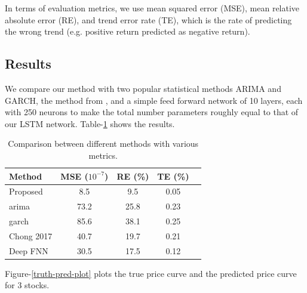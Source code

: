 \documentclass{article}
\begin{document}
In terms of evaluation metrics, we use mean squared error (MSE), mean relative absolute error (RE), and trend error rate (TE), which is the rate of predicting the wrong trend (e.g. positive return predicted as negative return).

\subsection{Results}
We compare our method with two popular statistical methods ARIMA and GARCH, the method from \cite{Chong2017}, and a simple feed forward network of 10 layers, each with 250 neurons to make the total number parameters roughly equal to that of our LSTM network. Table-\ref{comparison-table} shows the results.

\begin{table}[t]
\caption{Comparison between different methods with various metrics.}
\label{comparison-table}
\vskip 0.15in
\begin{center}
\begin{small}
\begin{sc}
\begin{tabular}{lcccr}
\hline
\abovespace\belowspace
Method & MSE ($10^{-7}$) & RE (\%) & TE (\%) \\
\hline
\abovespace
Proposed   & 8.5& 9.5& 0.05  \\
arima      & 73.2& 25.8& 0.23 \\
garch      & 85.6& 38.1& 0.25  \\
Chong 2017 & 40.7& 19.7& 0.21     \\
\belowspace
Deep FNN   & 30.5& 17.5& 0.12 \\
\hline
\end{tabular}
\end{sc}
\end{small}
\end{center}
\vskip -0.1in
\end{table}

Figure-\ref{truth-pred-plot} plots the true price curve and the predicted price curve for 3 stocks.
\end{document}
